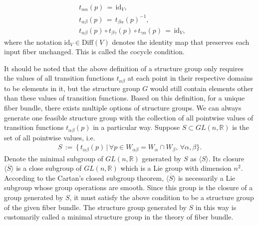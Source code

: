 \begin{equation}\label{cocycle condition}
    \begin{split}
        &t_{\alpha\alpha}\left(p\right)\,=\,\mathrm{id}_{V}, \\
        &t_{\alpha\beta}\left(p\right)\,=\,t_{\beta\alpha}\left(p\right)^{-1}, \\
        &t_{\alpha\beta}\left(p\right)\circ t_{\beta\gamma}\left(p\right)\circ t_{\gamma\alpha}\left(p\right)\,=\,\mathrm{id}_{V},
    \end{split}
\end{equation}
where the notation $\mathrm{id}_{V}\in\mathrm{Diff}\left(V\right)$ denotes the identity map that preserves each input fiber unchanged. This is called the cocycle condition. 
\par It should be noted that the above definition of a structure group only requires the values of all transition functions $t_{\alpha\beta}$ at each point in their respective domains to be elements in it, but the structure group $G$ would still contain elements other than these values of transition functions. Based on this definition, for a unique fiber bundle, there exists multiple options of structure groups. We can always generate one feasible structure group with the collection of all pointwise values of transition functions $t_{\alpha\beta}\left(p\right)$ in a particular way. Suppose $S\subset GL\left(n,\mathbb{R}\right)$ is the set of all pointwise values, i.e.
\begin{equation}
    \begin{split}
        S\,:=\,\{\,t_{\alpha\beta}\left(p\right)\,|\,\forall p\in W_{\alpha\beta}=W_{\alpha}\cap W_{\beta},\,\forall\alpha,\beta\}.
    \end{split}
\end{equation}
Denote the minimal subgroup of $GL\left(n,\mathbb{R}\right)$ generated by $S$ as $\langle S\rangle$. Its closure $\overline{\langle S\rangle}$ is a close subgroup of $GL\left(n,\mathbb{R}\right)$ which is a Lie group with dimension $n^{2}$. According to the Cartan's closed subgroup theorem, $\overline{\langle S\rangle}$ is necessarily a Lie subgroup whose group operations are smooth. Since this group is the closure of a group generated by $S$, it must satisfy the above condition to be a structure group of the given fiber bundle. The structure group generated by $S$ in this way is customarily called a minimal structure group in the theory of fiber bundle. 
